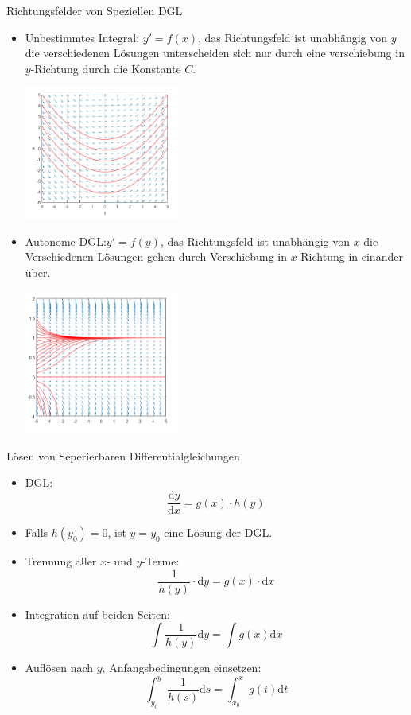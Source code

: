\begin{definition}{Richtungsfelder von Speziellen DGL}\\
  \begin{itemize}
    \item Unbestimmtes Integral: \(y'=f(x)\), das Richtungsfeld ist unabhängig von \(y\) die verschiedenen Lösungen
      unterscheiden sich nur durch eine verschiebung in \(y\)-Richtung durch die Konstante \(C\).
  \begin{center}
  \includegraphics[width=0.4\textwidth]{images/UnbestimmtesIntegral.png}
  \end{center}
\item Autonome DGL:\(y'=f(y)\), das Richtungsfeld ist unabhängig von \(x\) die Verschiedenen Lösungen gehen durch
  Verschiebung in \(x\)-Richtung in einander über.
  \begin{center}
  \includegraphics[width=0.4\textwidth]{images/AutonomeDGL.png}
  \end{center}
  \end{itemize}
\end{definition}
\begin{KR}{Lösen von Seperierbaren Differentialgleichungen}\\
  \begin{itemize}
    \item DGL:
      \[\frac{\mathrm{d}y}{\mathrm{d}x}=g(x)\cdot h(y)\]
    \item Falls \(h(y_0)=0\), ist \(y=y_0\) eine Lösung der DGL.
    \item Trennung aller \(x\)- und \(y\)-Terme:
      \[\frac{1}{h(y)}\cdot \mathrm{d}y=g(x)\cdot \mathrm{d}x\]
    \item Integration auf beiden Seiten:
      \[\int{\frac{1}{h(y)}\mathrm{d}y}=\int{g(x)\mathrm{d}x}\]
    \item Auflösen nach \(y\), Anfangsbedingungen einsetzen:
      \[\int_{y_0}^{y}{\frac{1}{h(s)}\mathrm{d}s}=\int_{x_0}^{x}{g(t)\mathrm{d}t}\]
  \end{itemize}
\end{KR}
